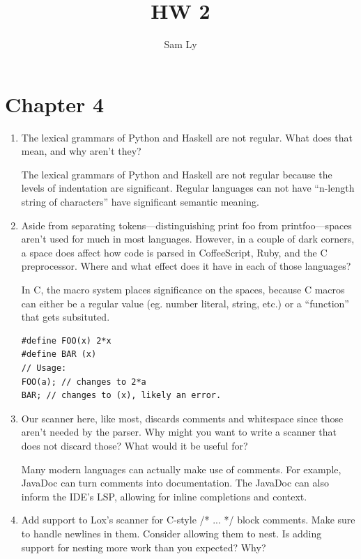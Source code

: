 \documentclass{article}
\title{HW 2}
\author{Sam Ly}
\begin{document}
\maketitle

\section*{Chapter 4}

\begin{enumerate}
    \item {
        The lexical grammars of Python and Haskell are not regular. What does 
        that mean, and why aren’t they?

        The lexical grammars of Python and Haskell are not regular because the 
        levels of indentation are significant. Regular languages can not have 
        ``n-length string of characters'' have significant semantic meaning.
    }
    \item {
        Aside from separating tokens—distinguishing print foo from printfoo—spaces 
        aren’t used for much in most languages. However, in a couple of dark 
        corners, a space does affect how code is parsed in CoffeeScript, Ruby, 
        and the C preprocessor. Where and what effect does it have in each of 
        those languages?

        In C, the macro system places significance on the spaces, because C 
        macros can either be a regular value (eg. number literal, string, etc.) 
        or a ``function'' that gets subsituted.

        \begin{lstlisting}
#define FOO(x) 2*x
#define BAR (x)
// Usage:
FOO(a); // changes to 2*a
BAR; // changes to (x), likely an error.
        \end{lstlisting}
    }
    \item {
        Our scanner here, like most, discards comments and whitespace since those 
        aren’t needed by the parser. Why might you want to write a scanner that 
        does not discard those? What would it be useful for?

        Many modern languages can actually make use of comments. For example, 
        JavaDoc can turn comments into documentation. The JavaDoc can also inform 
        the IDE's LSP, allowing for inline completions and context.
    }
    \item {
        Add support to Lox’s scanner for C-style /* ... */ block comments. Make 
        sure to handle newlines in them. Consider allowing them to nest. Is 
        adding support for nesting more work than you expected? Why?

}
\end{enumerate}
\end{document}
